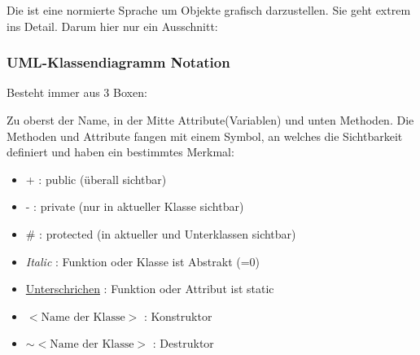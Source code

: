 Die  ist eine normierte Sprache um Objekte grafisch darzustellen. 
Sie geht extrem ins Detail. 
Darum hier nur ein Ausschnitt:

\subsubsection{UML-Klassendiagramm Notation}

Besteht immer aus 3 Boxen:\\

\noindent
\begin{minipage}{0.6\columnwidth}
\begin{center}
\end{center}
\end{minipage}
\begin{minipage}{0.4\columnwidth}

    Zu oberst der Name, in der Mitte Attribute(Variablen) und unten Methoden.
    Die Methoden und Attribute fangen mit einem Symbol, an welches die Sichtbarkeit definiert und haben ein bestimmtes Merkmal:

\end{minipage}

\begin{itemize}[itemsep=1pt, parsep=0pt]
    \item + : public (überall sichtbar)
    \item - : private (nur in  aktueller Klasse sichtbar)
    \item \# : protected (in aktueller und Unterklassen sichtbar)
    \item \textit{Italic} :  Funktion oder Klasse ist Abstrakt (=0)
    \item \underline{Unterschrichen} : Funktion oder Attribut ist static
    \item $<\text{Name der Klasse}>$ :  Konstruktor
    \item $\sim<\text{Name der Klasse}>$ : Destruktor
\end{itemize}



